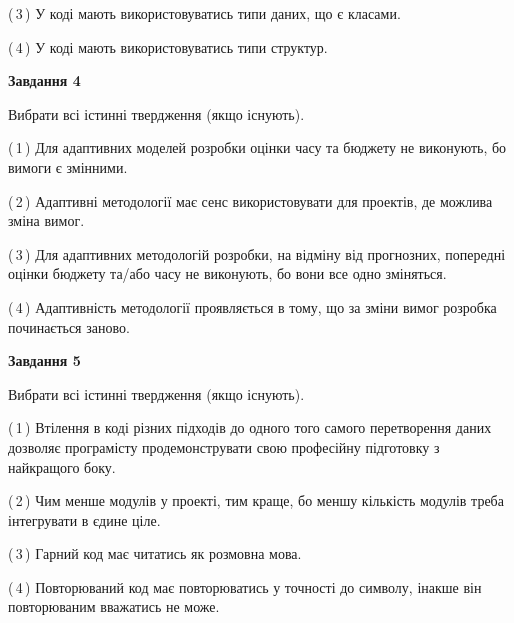 \documentclass[10pt, ukrainian]{article}
\begin{document}
{\begin {large}
(\,3\,) У коді мають використовуватись типи даних, що є класами. %



(\,4\,) У коді мають використовуватись типи структур. %


{\begin {center}\textbf{Завдання 4}\end {center}}\par
Вибрати всі істинні твердження (якщо існують).\par
\vspace{2mm}



(\,1\,) Для адаптивних моделей розробки оцінки часу та бюджету не виконують, бо вимоги є змінними. %



(\,2\,) Адаптивні методології має сенс використовувати для проектів, де можлива зміна вимог. %



(\,3\,) Для адаптивних методологій розробки, на відміну від прогнозних, попередні оцінки бюджету та/або часу не виконують, бо вони все одно зміняться. %



(\,4\,) Адаптивність методології проявляється в тому, що за зміни вимог розробка починається заново. %


{\begin {center}\textbf{Завдання 5}\end {center}}\par
Вибрати всі істинні твердження (якщо існують).\par
\vspace{2mm}



(\,1\,) Втілення в коді різних підходів до одного того самого перетворення даних дозволяє програмісту продемонструвати свою професійну підготовку з найкращого боку. %



(\,2\,) Чим менше модулів у проекті, тим краще, бо меншу кількість модулів треба інтегрувати в єдине ціле. %



(\,3\,) Гарний код має читатись як розмовна мова. %



(\,4\,) Повторюваний код має повторюватись у точності до символу, інакше він повторюваним вважатись не може. %

\newpage


\end{large}}
\end{document}
